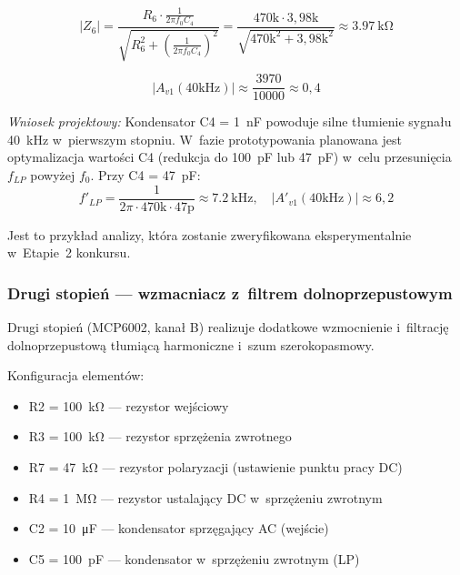 \documentclass[a4paper,11pt]{article}
\begin{document}
\begin{equation}
    |Z_6| = \frac{R_6 \cdot \frac{1}{2\pi f_0 C_4}}{\sqrt{R_6^2 + \left(\frac{1}{2\pi f_0 C_4}\right)^2}}
    = \frac{470\text{k} \cdot 3{,}98\text{k}}{\sqrt{470\text{k}^2 + 3{,}98\text{k}^2}} \approx \SI{3,97}{\kilo\ohm}
    \label{eq:z6}
\end{equation}

\begin{equation}
    |A_{v1}(40\text{kHz})| \approx \frac{3970}{10000} \approx 0{,}4
    \label{eq:gain1_actual}
\end{equation}

\textit{Wniosek projektowy:} Kondensator C4 = \SI{1}{\nano\farad} powoduje
silne tłumienie sygnału \SI{40}{\kilo\hertz} w~pierwszym stopniu. W~fazie
prototypowania planowana jest optymalizacja wartości C4 (redukcja do
\SI{100}{\pico\farad} lub \SI{47}{\pico\farad}) w~celu przesunięcia $f_{LP}$
powyżej $f_0$. Przy C4 = \SI{47}{\pico\farad}$:$
\begin{equation}
    f'_{LP} = \frac{1}{2\pi \cdot 470\text{k} \cdot 47\text{p}} \approx \SI{7,2}{\kilo\hertz}, \quad
    |A'_{v1}(40\text{kHz})| \approx 6{,}2
    \label{eq:gain1_opt}
\end{equation}

Jest to przykład analizy, która zostanie zweryfikowana eksperymentalnie
w~Etapie~2 konkursu.

\subsubsection{Drugi stopień --- wzmacniacz z~filtrem dolnoprzepustowym}

Drugi stopień (MCP6002, kanał B) realizuje dodatkowe wzmocnienie
i~filtrację dolnoprzepustową tłumiącą harmoniczne i~szum szerokopasmowy.

Konfiguracja elementów:
\begin{itemize}[nosep]
    \item R2 = \SI{100}{\kilo\ohm} --- rezystor wejściowy
    \item R3 = \SI{100}{\kilo\ohm} --- rezystor sprzężenia zwrotnego
    \item R7 = \SI{47}{\kilo\ohm} --- rezystor polaryzacji (ustawienie punktu pracy DC)
    \item R4 = \SI{1}{\mega\ohm} --- rezystor ustalający DC w~sprzężeniu zwrotnym
    \item C2 = \SI{10}{\micro\farad} --- kondensator sprzęgający AC (wejście)
    \item C5 = \SI{100}{\pico\farad} --- kondensator w~sprzężeniu zwrotnym (LP)
\end{itemize}
\end{document}
